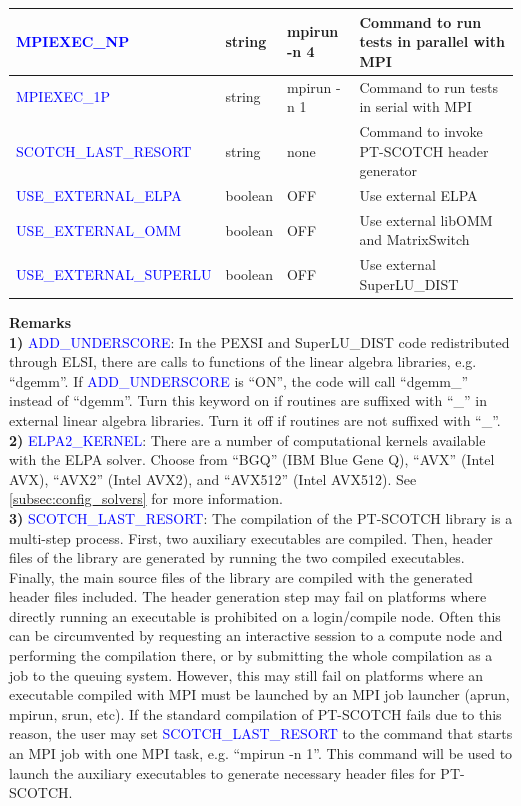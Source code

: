 \documentclass{report}
\begin{document}
\begin{tabular}[]{|p{50mm}|p{15mm}|p{20mm}|p{80mm}|}
\hline
\textcolor{blue}{MPIEXEC\_NP}                & string  & mpirun -n 4 & Command to run tests in parallel with MPI\\
\hline
\textcolor{blue}{MPIEXEC\_1P}                & string  & mpirun -n 1 & Command to run tests in serial with MPI\\
\hline
\textcolor{blue}{SCOTCH\_LAST\_RESORT}       & string  & none        & Command to invoke PT-SCOTCH header generator\\
\hline
\textcolor{blue}{USE\_EXTERNAL\_ELPA}        & boolean & OFF         & Use external ELPA\\
\hline
\textcolor{blue}{USE\_EXTERNAL\_OMM}         & boolean & OFF         & Use external libOMM and MatrixSwitch\\
\hline
\textcolor{blue}{USE\_EXTERNAL\_SUPERLU}     & boolean & OFF         & Use external SuperLU\_DIST\\
\hline
\end{tabular}

\newpage
\textbf{Remarks}\\

\textbf{1)} \textcolor{blue}{ADD\_UNDERSCORE}:  In the PEXSI and SuperLU\_DIST code redistributed through ELSI, there are calls to functions of the linear algebra libraries, e.g. ``dgemm''.  If \textcolor{blue}{ADD\_UNDERSCORE} is ``ON'', the code will call ``dgemm\_'' instead of ``dgemm''.  Turn this keyword on if routines are suffixed with ``\_'' in external linear algebra libraries.  Turn it off if routines are not suffixed with ``\_''.\\

\textbf{2)} \textcolor{blue}{ELPA2\_KERNEL}:  There are a number of computational kernels available with the ELPA solver.  Choose from ``BGQ'' (IBM Blue Gene Q), ``AVX'' (Intel AVX), ``AVX2'' (Intel AVX2), and ``AVX512'' (Intel AVX512).  See \ref{subsec:config_solvers} for more information.\\

\textbf{3)} \textcolor{blue}{SCOTCH\_LAST\_RESORT}:  The compilation of the PT-SCOTCH library is a multi-step process.  First, two auxiliary executables are compiled.  Then, header files of the library are generated by running the two compiled executables.  Finally, the main source files of the library are compiled with the generated header files included.  The header generation step may fail on platforms where directly running an executable is prohibited on a login/compile node.  Often this can be circumvented by requesting an interactive session to a compute node and performing the compilation there, or by submitting the whole compilation as a job to the queuing system.  However, this may still fail on platforms where an executable compiled with MPI must be launched by an MPI job launcher (aprun, mpirun, srun, etc).  If the standard compilation of PT-SCOTCH fails due to this reason, the user may set \textcolor{blue}{SCOTCH\_LAST\_RESORT} to the command that starts an MPI job with one MPI task, e.g. ``mpirun -n 1''.  This command will be used to launch the auxiliary executables to generate necessary header files for PT-SCOTCH.\\
\end{document}
